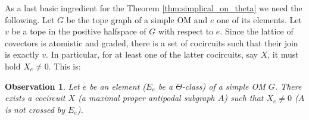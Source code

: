 \documentclass[final,11pt]{article}
\newtheorem{obs}[thm]{Observation}
\newcommand{\comment}[1]{\textcolor{red}{#1}}
\newcommand{\TODO}[1]{\emph{\textcolor{red}{#1}}}
\begin{document}
% 
% 

As a last basic ingredient for the Theorem \ref{thm:simplical_on_theta} we need the following. Let $G$ be the tope graph of a simple OM and $e$ one of its elements. Let $v$ be a tope in the positive halfspace of $G$ with respect to $e$. Since the lattice of covectors is atomistic and graded, there is a set of cocircuits such that their join is exactly $v$. In particular, for at least one of the latter cocircuits, say $X$, it must hold $X_e \neq 0$. 
%
This is:
\begin{obs}\label{obs:coloop}
Let $e$ be an element ($E_e$ be a $\Theta$-class) of a simple OM $G$. There exists a cocircuit $X$ (a maximal proper antipodal subgraph $A$) such that $X_e \neq 0$ ($A$ is not crossed by $E_e$).
\end{obs}


% 
% 
\end{document}
